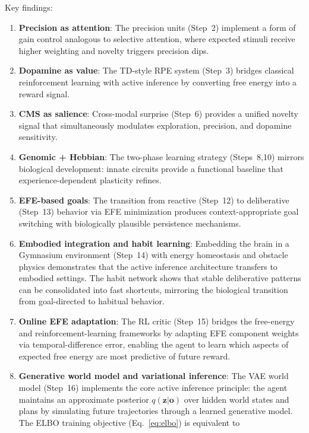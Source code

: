 \documentclass[11pt,a4paper]{article}
\begin{document}
Key findings:
\begin{enumerate}[nosep]
  \item \textbf{Precision as attention}: The precision units (Step~2) implement
    a form of gain control analogous to selective attention, where expected
    stimuli receive higher weighting and novelty triggers precision dips.
  \item \textbf{Dopamine as value}: The TD-style RPE system (Step~3) bridges
    classical reinforcement learning with active inference by converting free
    energy into a reward signal.
  \item \textbf{CMS as salience}: Cross-modal surprise (Step~6) provides a
    unified novelty signal that simultaneously modulates exploration, precision,
    and dopamine sensitivity.
  \item \textbf{Genomic + Hebbian}: The two-phase learning strategy (Steps~8,10)
    mirrors biological development: innate circuits provide a functional
    baseline that experience-dependent plasticity refines.
  \item \textbf{EFE-based goals}: The transition from reactive (Step~12) to
    deliberative (Step~13) behavior via EFE minimization produces context-appropriate
    goal switching with biologically plausible persistence mechanisms.
  \item \textbf{Embodied integration and habit learning}: Embedding the brain in
    a Gymnasium environment (Step~14) with energy homeostasis and obstacle physics
    demonstrates that the active inference architecture transfers to embodied
    settings.
    The habit network shows that stable deliberative patterns can be consolidated
    into fast shortcuts, mirroring the biological transition from goal-directed
    to habitual behavior.
  \item \textbf{Online EFE adaptation}: The RL critic (Step~15) bridges the
    free-energy and reinforcement-learning frameworks by adapting EFE component
    weights via temporal-difference error, enabling the agent to learn which
    aspects of expected free energy are most predictive of future reward.
  \item \textbf{Generative world model and variational inference}:
    The VAE world model (Step~16) implements the core active inference
    principle: the agent maintains an approximate posterior
    $q(\mathbf{z}|\mathbf{o})$ over hidden world states and plans by
    simulating future trajectories through a learned generative model.
    The ELBO training objective (Eq.~\ref{eq:elbo}) is equivalent to

\end{enumerate}
\end{document}
